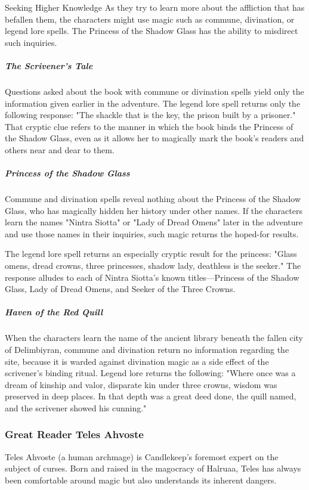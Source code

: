 \documentclass[10pt,a4paper,twoside,bg=print,twocolumn,openany,nodeprecatedcode]{dndbook}
\begin{document}
\begin{DndSidebar}[float=!b]{Seeking Higher Knowledge}
As they try to learn more about the affliction that has befallen them, the characters might use magic such as commune, divination, or legend lore spells. The Princess of the Shadow Glass has the ability to misdirect such inquiries.



\subparagraph{The Scrivener's Tale}
Questions asked about the book with commune or divination spells yield only the information given earlier in the adventure. The legend lore spell returns only the following response: "The shackle that is the key, the prison built by a prisoner." That cryptic clue refers to the manner in which the book binds the Princess of the Shadow Glass, even as it allows her to magically mark the book's readers and others near and dear to them.



\subparagraph{Princess of the Shadow Glass}
Commune and divination spells reveal nothing about the Princess of the Shadow Glass, who has magically hidden her history under other names. If the characters learn the names "Nintra Siotta" or "Lady of Dread Omens" later in the adventure and use those names in their inquiries, such magic returns the hoped-for results.

The legend lore spell returns an especially cryptic result for the princess: "Glass omens, dread crowns, three princesses, shadow lady, deathless is the seeker." The response alludes to each of Nintra Siotta's known titles—Princess of the Shadow Glass, Lady of Dread Omens, and Seeker of the Three Crowns.



\subparagraph{Haven of the Red Quill}
When the characters learn the name of the ancient library beneath the fallen city of Delimbiyran, commune and divination return no information regarding the site, because it is warded against divination magic as a side effect of the scrivener's binding ritual. Legend lore returns the following: "Where once was a dream of kinship and valor, disparate kin under three crowns, wisdom was preserved in deep places. In that depth was a great deed done, the quill named, and the scrivener showed his cunning."



\end{DndSidebar}

\subsubsection{Great Reader Teles Ahvoste}
Teles Ahvoste (a human archmage) is Candlekeep's foremost expert on the subject of curses. Born and raised in the magocracy of Halruaa, Teles has always been comfortable around magic but also understands its inherent dangers.
\end{document}
